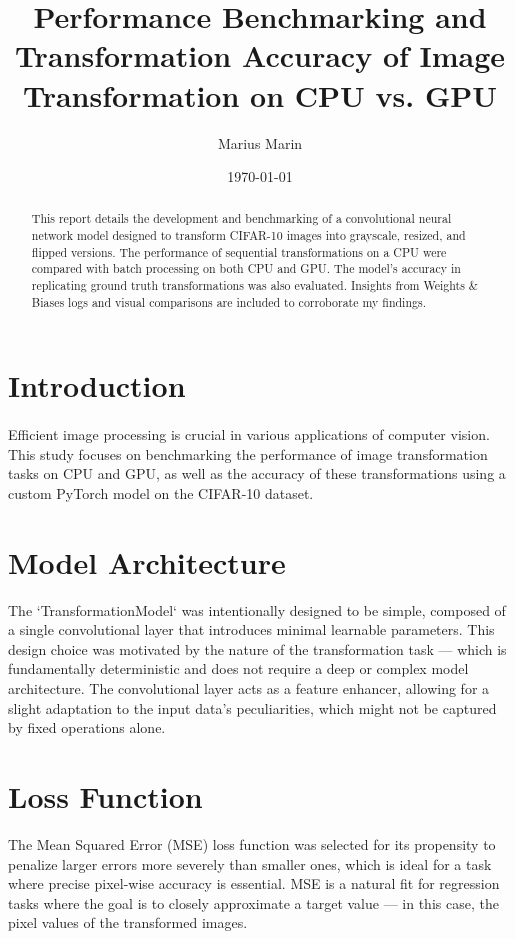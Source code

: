 \documentclass[12pt, a4paper]{article}
\title{Performance Benchmarking and Transformation Accuracy of Image Transformation on CPU vs. GPU}
\author{Marius Marin}
\date{\today}
\begin{document}
\maketitle

\begin{abstract}
This report details the development and benchmarking of a convolutional neural network model designed to transform CIFAR-10 images into grayscale, resized, and flipped versions. The performance of sequential transformations on a CPU were compared with batch processing on both CPU and GPU. The model's accuracy in replicating ground truth transformations was also evaluated. Insights from Weights \& Biases logs and visual comparisons are included to corroborate my findings.
\end{abstract}

\section{Introduction}
\paragraph{}Efficient image processing is crucial in various applications of computer vision. This study focuses on benchmarking the performance of image transformation tasks on CPU and GPU, as well as the accuracy of these transformations using a custom PyTorch model on the CIFAR-10 dataset.


\section{Model Architecture}
The `TransformationModel` was intentionally designed to be simple, composed of a single convolutional layer that introduces minimal learnable parameters. This design choice was motivated by the nature of the transformation task — which is fundamentally deterministic and does not require a deep or complex model architecture. The convolutional layer acts as a feature enhancer, allowing for a slight adaptation to the input data's peculiarities, which might not be captured by fixed operations alone.

\section{Loss Function}
The Mean Squared Error (MSE) loss function was selected for its propensity to penalize larger errors more severely than smaller ones, which is ideal for a task where precise pixel-wise accuracy is essential. MSE is a natural fit for regression tasks where the goal is to closely approximate a target value — in this case, the pixel values of the transformed images.
\end{document}

